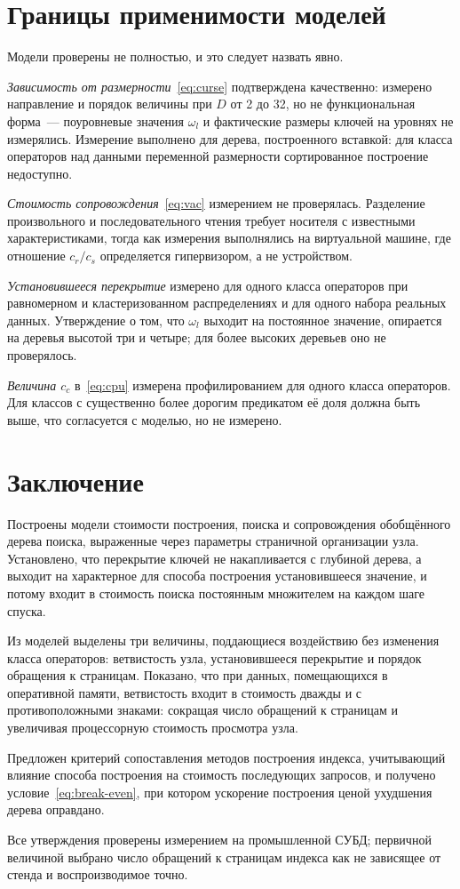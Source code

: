 \section{Границы применимости моделей}

Модели проверены не полностью, и это следует назвать явно.

\emph{Зависимость от размерности}~\eqref{eq:curse} подтверждена качественно:
измерено направление и порядок величины при $D$ от 2 до 32, но не функциональная
форма~--- поуровневые значения $\omega_l$ и фактические размеры ключей на
уровнях не измерялись. Измерение выполнено для дерева, построенного вставкой:
для класса операторов над данными переменной размерности сортированное
построение недоступно.

\emph{Стоимость сопровождения}~\eqref{eq:vac} измерением не проверялась.
Разделение произвольного и последовательного чтения требует носителя с
известными характеристиками, тогда как измерения выполнялись на виртуальной
машине, где отношение $c_r/c_s$ определяется гипервизором, а не устройством.

\emph{Установившееся перекрытие} измерено для одного класса операторов при
равномерном и кластеризованном распределениях и для одного набора реальных
данных. Утверждение о том, что $\omega_l$ выходит на постоянное значение,
опирается на деревья высотой три и четыре; для более высоких деревьев оно не
проверялось.

\emph{Величина $c_c$} в~\eqref{eq:cpu} измерена профилированием для одного
класса операторов. Для классов с существенно более дорогим предикатом её доля
должна быть выше, что согласуется с моделью, но не измерено.

\section{Заключение}

Построены модели стоимости построения, поиска и сопровождения обобщённого
дерева поиска, выраженные через параметры страничной организации узла.
Установлено, что перекрытие ключей не накапливается с глубиной дерева, а
выходит на характерное для способа построения установившееся значение, и потому
входит в стоимость поиска постоянным множителем на каждом шаге спуска.

Из моделей выделены три величины, поддающиеся воздействию без изменения класса
операторов: ветвистость узла, установившееся перекрытие и порядок обращения к
страницам. Показано, что при данных, помещающихся в оперативной памяти,
ветвистость входит в стоимость дважды и с противоположными знаками:
сокращая число обращений к страницам и увеличивая процессорную стоимость
просмотра узла.

Предложен критерий сопоставления методов построения индекса, учитывающий
влияние способа построения на стоимость последующих запросов, и получено
условие~\eqref{eq:break-even}, при котором ускорение построения ценой ухудшения
дерева оправдано.

Все утверждения проверены измерением на промышленной СУБД; первичной величиной
выбрано число обращений к страницам индекса как не зависящее от стенда и
воспроизводимое точно.
